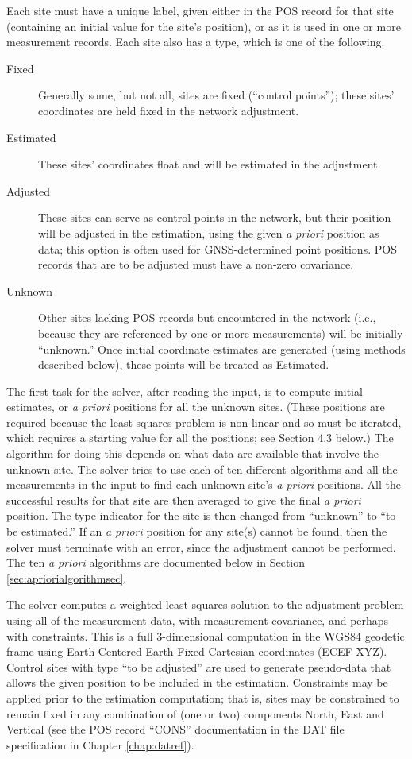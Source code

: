 Each site must have a unique label, given either in the POS record for that site (containing an initial value for the site's position), or as it is used in one or more measurement records. Each site also has a type, which is one of the following.
\begin{description}
\item[Fixed] Generally some, but not all, sites are fixed (``control points''); these sites' coordinates are held fixed in the network adjustment.
\item[Estimated] These sites' coordinates float and will be estimated in the adjustment.
\item[Adjusted] These sites can serve as control points in the network, but their position will be adjusted in the estimation, using the given \emph{a priori} position as data; this option is often used for GNSS-determined point positions. POS records that are to be adjusted must have a non-zero covariance.
\item[Unknown] Other sites lacking POS records but encountered in the network (i.e., because they are referenced by one or more measurements) will be initially ``unknown.''  Once initial coordinate estimates are generated (using methods described below), these points will be treated as Estimated.
\end{description}


The first task for the solver, after reading the input, is to compute initial estimates, or \emph{a priori} positions for all the unknown sites. (These positions are required because the least squares problem is non-linear and so must be iterated, which requires a starting value for all the positions; see Section 4.3 below.) The algorithm for doing this depends on what data are available that involve the unknown site. The solver tries to use each of ten different algorithms and all the measurements in the input to find each unknown site's \emph{a priori} positions. All the successful results for that site are then averaged to give the final \emph{a priori} position. The type indicator for the site is then changed from ``unknown'' to ``to be estimated.'' If an \emph{a priori} position for any site(s) cannot be found, then the solver must terminate with an error, since the adjustment cannot be performed. The ten \emph{a priori} algorithms are documented below in Section \ref{sec:apriorialgorithmsec}.

The solver computes a weighted least squares solution to the adjustment problem using all of the measurement data, with measurement covariance, and perhaps with constraints. This is a full 3-dimensional computation in the WGS84 geodetic frame using Earth-Centered Earth-Fixed Cartesian coordinates (ECEF XYZ). Control sites with type ``to be adjusted'' are used to generate pseudo-data that allows the given position to be included in the estimation. Constraints may be applied prior to the estimation computation; that is, sites may be constrained to remain fixed in any combination of (one or two) components North, East and Vertical (see the POS record ``CONS'' documentation in the DAT file specification in Chapter \ref{chap:datref}).

